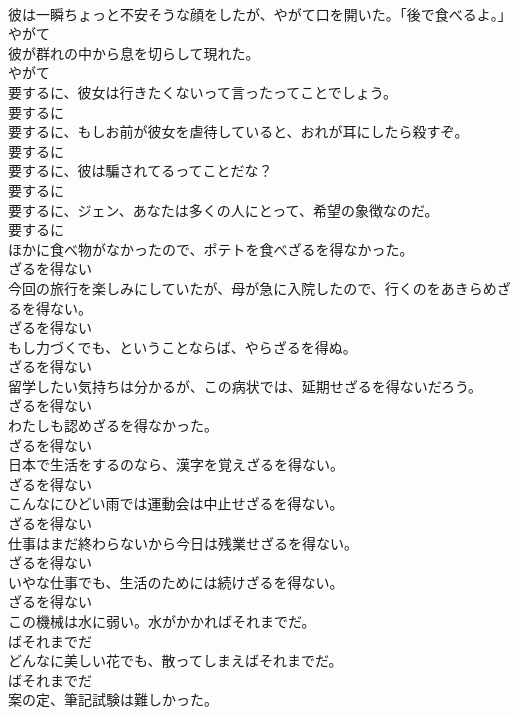 \documentclass[8pt]{extreport}
\begin{document}
\begin{CJK}{UTF8}{min}
\\	彼は一瞬ちょっと不安そうな顔をしたが、やがて口を開いた。「後で食べるよ。」	
\\	やがて
\\	彼が群れの中から息を切らして現れた。	
\\	やがて
\\	要するに、彼女は行きたくないって言ったってことでしょう。	
\\	要するに
\\	要するに、もしお前が彼女を虐待していると、おれが耳にしたら殺すぞ。	
\\	要するに
\\	要するに、彼は騙されてるってことだな？	
\\	要するに
\\	要するに、ジェン、あなたは多くの人にとって、希望の象徴なのだ。	
\\	要するに
\\	ほかに食べ物がなかったので、ポテトを食べざるを得なかった。	
\\	ざるを得ない
\\	今回の旅行を楽しみにしていたが、母が急に入院したので、行くのをあきらめざるを得ない。	
\\	ざるを得ない
\\	もし力づくでも、ということならば、やらざるを得ぬ。	
\\	ざるを得ない
\\	留学したい気持ちは分かるが、この病状では、延期せざるを得ないだろう。	
\\	ざるを得ない
\\	わたしも認めざるを得なかった。	
\\	ざるを得ない
\\	日本で生活をするのなら、漢字を覚えざるを得ない。	
\\	ざるを得ない
\\	こんなにひどい雨では運動会は中止せざるを得ない。	
\\	ざるを得ない
\\	仕事はまだ終わらないから今日は残業せざるを得ない。	
\\	ざるを得ない
\\	いやな仕事でも、生活のためには続けざるを得ない。	
\\	ざるを得ない
\\	この機械は水に弱い。水がかかればそれまでだ。	
\\	ばそれまでだ
\\	どんなに美しい花でも、散ってしまえばそれまでだ。	
\\	ばそれまでだ
\\	案の定、筆記試験は難しかった。	

\end{CJK}
\end{document}
